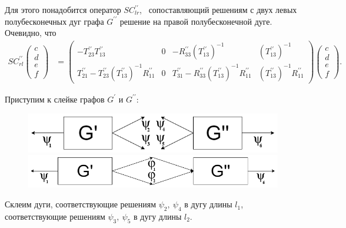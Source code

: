 \documentclass[a4 paper, 12 pt]{extarticle}
\begin{document}
   Для этого понадобится оператор $SC_{lr}^{\prime\prime}$, \ сопоставляющий решениям с двух левых полубесконечных дуг графа $G^{\prime\prime}$ решение на правой полубесконечной дуге. Очевидно, что
    \[
   \begin{aligned}
   SC_{rl}^{\prime\prime}\left(
   \begin{array}{c}
   c \\
   d \\
   e \\
   f
   \end{array}\right) &= \left(\begin{array}{cccc}
   -T_{23}^{\prime\prime} T_{13}^{\prime\prime} & 0 & -R_{33}^{\prime\prime} \left(T_{13}^{\prime\prime}\right)^{-1} & \left(T_{13}^{\prime\prime}\right)^{-1} \\
   T_{21}^{\prime\prime}- T_{23}^{\prime\prime}\left(T_{13}^{\prime\prime}\right)^{-1}R_{11}^{\prime\prime} & 0 & T_{31}^{\prime\prime} - R_{33}^{\prime\prime} \left(T_{13}^{\prime\prime}\right)^{-1}R_{11}^{\prime\prime} & \left(T_{13}^{\prime\prime}\right)^{-1}R_{11}^{\prime\prime}
   \end{array}\right)
   \left(\begin{array}{c}
   c \\
   d \\
   e \\
   f
   \end{array}\right).
   \end{aligned}\]
   
   Приступим к слейке графов $G^\prime$ и $G^{\prime \prime}$:
   \begin{figure}[!htb]
   	\centering
   	\includegraphics[scale=0.54]{skleika2.png} \\
   	\includegraphics[scale=0.45]{skleika3.png}
   \end{figure}
   
   Склеим дуги, соответствующие решениям $\psi_2, \ \psi_4$ в дугу длины $l_1$, соответствующие решениям $\psi_3, \ \psi_5$ в дугу длины $l_2$.
   
\end{document}
